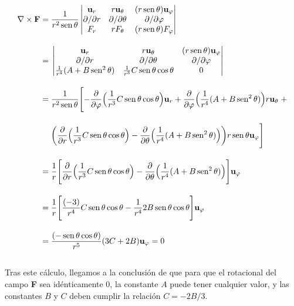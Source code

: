 \begin{align*}
    \nabla \times \textbf{F}
    =\; &
    \frac{1}{r^2 \operatorname{sen} \theta}
    \begin{vmatrix}
        \mathbf{u}_{r}        & r\mathbf{u_{\theta}}       & (r\operatorname{sen}\theta)\mathbf{u_{\varphi}} \\
        \partial / \partial r & \partial / \partial \theta & \partial / \partial \varphi       \\
        F_r                   & r F_\theta                 & (r \operatorname{sen}\theta)F_\varphi           \\
    \end{vmatrix}
    \\[10pt]
    =\; & \begin{vmatrix}
              \mathbf{u}_{r}                      & r\mathbf{u_{\theta}}                 & (r\operatorname{sen}\theta)\mathbf{u_{\varphi}} \\
              \partial / \partial r               & \partial / \partial \theta           & \partial / \partial \varphi       \\
              \frac{1}{r^4}(A + B \operatorname{sen}^2{\theta}) & \frac{1}{r^3}C \operatorname{sen}\theta \cos\theta & 0                                 \\
    \end{vmatrix}     \\[10pt]
    =\; &   \frac{1}{r^2 \operatorname{sen} \theta} \Biggl[
        - \frac{\partial}{\partial \varphi} \Bigl( \frac{1}{r^3} C \operatorname{sen}\theta \cos\theta \Bigr) \mathbf{u}_{r}
        + \frac{\partial}{\partial \varphi} \Bigl( \frac{1}{r^4} (A + B \operatorname{sen}^2{\theta})  \Bigr) r\mathbf{u}_{\theta} \; +  \\[10pt]
        & \biggl( \frac{\partial}{\partial r} \Bigl( \frac{1}{r^3} C \operatorname{sen}\theta \cos\theta   \Bigr)
        -  \frac{\partial}{\partial \theta} \Bigl( \frac{1}{r^4} (A + B \operatorname{sen}^2{\theta})
        \Bigr) \biggr) r \operatorname{sen}\theta \mathbf{u}_{\varphi}
        \Biggr] \\[10pt]
    =\; &  \frac{1}{r}
    \Biggl[
        \frac{\partial}{\partial r}
        \Bigl( \frac{1}{r^3} C \operatorname{sen}\theta \cos\theta
        \Bigr)
        -
        \frac{\partial}{\partial \theta}
        \Bigl( \frac{1}{r^4} (A + B \operatorname{sen}^2{\theta})
        \Bigr)
        \Biggr] \mathbf{u}_{\varphi}\\[10pt]
    =\; &  \frac{1}{r}
    \Biggl[
        \frac{(-3)}{r^4} C \operatorname{sen}\theta \cos\theta
        -
        \frac{1}{r^4} 2 B \operatorname{sen}\theta \cos\theta
        \Biggr] \mathbf{u}_{\varphi}\\[10pt]
    =\; &
    \frac{(- \operatorname{sen}\theta \cos\theta)}{r^5} (3C + 2B)  \mathbf{u}_{\varphi}  = 0 \\[10pt]
\end{align*}


Tras este cálculo, llegamos a la conclusión de que para que el rotacional del campo \textbf{F} sea idénticamente 0,
la constante $A$ puede tener cualquier valor,
y las constantes $B$ y $C$ deben cumplir la relación $C = -2 B / 3$.






